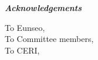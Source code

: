 \begin{center}
\textbf{\textit{Acknowledgements}}
\end{center}

To Eunseo,
\\
To Committee members,
\\
To CERI, 
